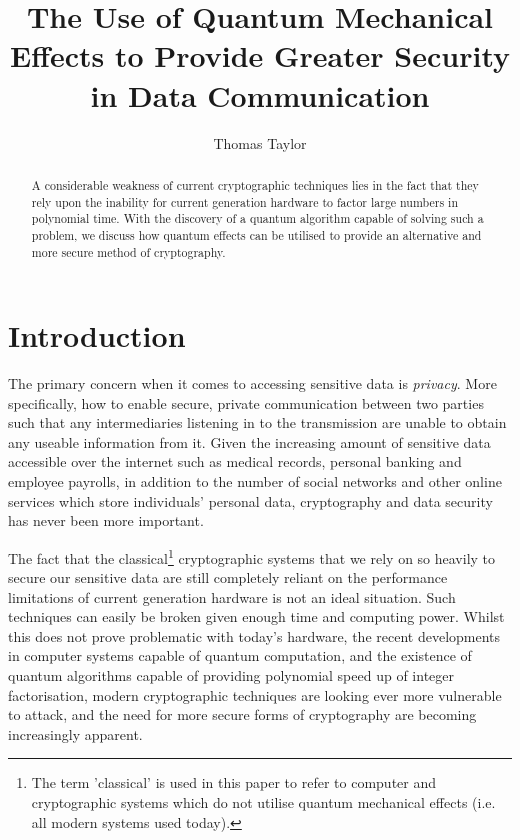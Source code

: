 \documentclass[runningheads,a4paper]{llncs}
\begin{document}
\mainmatter  

\title{The Use of Quantum Mechanical Effects to Provide Greater Security in Data Communication}
\author{Thomas Taylor\\ \mail}

\maketitle

\begin{abstract}
A considerable weakness of current cryptographic techniques lies in the fact that they rely upon the inability for current generation hardware to factor large numbers in polynomial time. With the discovery of a quantum algorithm capable of solving such a problem, we discuss how quantum effects can be utilised to provide an alternative and more secure method of cryptography.

\end{abstract}

\section{Introduction}

The primary concern when it comes to accessing sensitive data is \emph{privacy}. More specifically, how to enable secure, private communication between two parties such that any intermediaries listening in to the transmission are unable to obtain any useable information from it\cite{Rivest:1990fk}. Given the increasing amount of sensitive data accessible over the internet such as medical records, personal banking and employee payrolls, in addition to the number of social networks and other online services which store individuals' personal data, cryptography and data security has never been more important.

The fact that the classical\footnote[1]{The term 'classical' is used in this paper to refer to computer and cryptographic systems which do not utilise quantum mechanical effects (i.e. all modern systems used today).} cryptographic systems that we rely on so heavily to secure our sensitive data are still completely reliant on the performance limitations of current generation hardware is not an ideal situation. Such techniques can easily be broken given enough time and computing power. Whilst this does not prove problematic with today's hardware, the recent developments in computer systems capable of quantum computation\cite{Lu:2007uq}, and the existence of quantum algorithms capable of providing polynomial speed up of integer factorisation\cite{Shor:1994fk}, modern cryptographic techniques are looking ever more vulnerable to attack, and the need for more secure forms of cryptography are becoming increasingly apparent.
\end{document}
